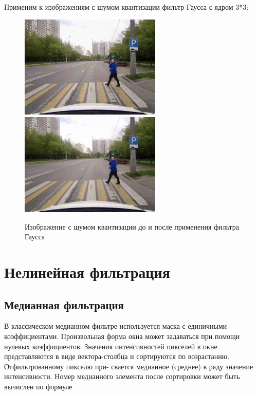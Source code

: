 \pagebreak
Применим к изображениям с шумом квантизации фильтр Гаусса с ядром 3*3:

\begin{figure}[ht]
    \centering
    \includegraphics[width=0.6\textwidth]{../outputs/image_quant_noise.png}
    \includegraphics[width=0.6\textwidth]{../addition/image_quant_median_filter_k5.png}
    \caption{Изображение с шумом квантизации до и после применения фильтра Гаусса}
    \label{fig:stich_images}
\end{figure}



\pagebreak

\section{Нелинейная фильтрация}

\subsection{Медианная фильтрация}

В классическом медианном фильтре используется маска с единичными коэффициентами. Произвольная форма окна 
может задаваться при помощи нулевых коэффициентов. Значения интенсивностей пикселей в окне представляются 
в виде вектора-столбца и сортируются по возрастанию. Отфильтрованному пикселю при-
свается медианное (среднее) в ряду значение интенсивности. Номер медианного элемента после сортировки может быть вычислен
по формуле 

